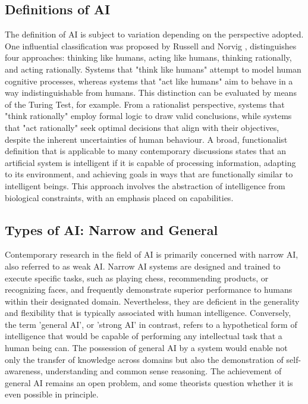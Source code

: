 \documentclass[runningheads]{llncs}
\begin{document}
\subsection{Definitions of AI}
%
The definition of AI is subject to variation depending on the perspective adopted. One influential classification was proposed by Russell and Norvig \cite{russell2010artificial}, distinguishes four approaches: thinking like humans, acting like humans, thinking rationally, and acting rationally. Systems that "think like humans" attempt to model human cognitive processes, whereas systems that "act like humans" aim to behave in a way indistinguishable from humans. This distinction can be evaluated by means of the Turing Test, for example. From a rationalist perspective, systems that "think rationally" employ formal logic to draw valid conclusions, while systems that "act rationally" seek optimal decisions that align with their objectives, despite the inherent uncertainties of human behaviour.
A broad, functionalist definition that is applicable to many contemporary discussions states that an artificial system is intelligent if it is capable of processing information, adapting to its environment, and achieving goals in ways that are functionally similar to intelligent beings. This approach involves the abstraction of intelligence from biological constraints, with an emphasis placed on capabilities.
%
\subsection{Types of AI: Narrow and General}
%
Contemporary research in the field of AI is primarily concerned with narrow AI, also referred to as weak AI. Narrow AI systems are designed and trained to execute specific tasks, such as playing chess, recommending products, or recognizing faces, and frequently demonstrate superior performance to humans within their designated domain. Nevertheless, they are deficient in the generality and flexibility that is typically associated with human intelligence.
Conversely, the term 'general AI', or 'strong AI' in contrast, refers to a hypothetical form of intelligence that would be capable of performing any intellectual task that a human being can. The possession of general AI by a system would enable not only the transfer of knowledge across domains but also the demonstration of self-awareness, understanding and common sense reasoning. The achievement of general AI remains an open problem, and some theorists question whether it is even possible in principle.
%
%
\end{document}
